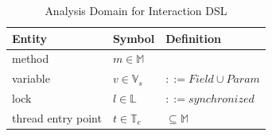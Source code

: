 \vspace{-0.5em}
\begin{table}[H]
\centering \scriptsize
\caption{Analysis Domain for Interaction DSL}
\vspace{-8pt}
\label{tab:entity-domain}
\renewcommand{\arraystretch}{1.25}
\begin{tabular}{@{}l l l@{}}
\toprule
\textbf{Entity} & \textbf{Symbol} & \textbf{Definition} \\
\midrule
method
  & $m \in \mathbb{M}$ 
  &  \\

variable
  & $v \in \mathbb{V}_{s}$ 
  &  $::= Field \cup Param$\\

lock 
  & $l \in \mathbb{L}$ 
  & $::= synchronized$ \\

thread entry point
  & $t \in \mathbb{T}_e$ 
  & $\subseteq \mathbb{M}$  \\
\bottomrule
\end{tabular}
\end{table}
\vspace{-8pt}